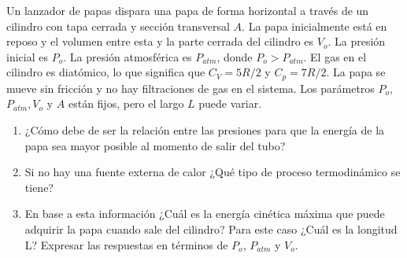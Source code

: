 \begin{mdframed}[style=warning]
	\begin{ejercicio}
		Un lanzador de papas dispara una papa de forma horizontal a través de un cilindro con tapa cerrada y sección transversal $A$. La papa inicialmente está en reposo y el volumen entre esta y la parte cerrada del cilindro es $V_o$. La presión inicial es $P_o$. La presión atmosférica es $P_{atm}$, donde $P_o > P_{atm}$. El gas en el cilindro es diatómico, lo que significa que $C_V = 5R/2$ y $C_p = 7R/2$. La papa se mueve sin fricción y no hay filtraciones de gas en el sistema. Los parámetros $P_o$, $P_{atm}, V_o$ y $A$ están fijos, pero el largo $L$ puede variar.
		\begin{enumerate}
			\item ¿Cómo debe de ser la relación entre las presiones para que la energía de la papa sea mayor posible al momento de salir del tubo?
			\item Si no hay una fuente externa de calor ¿Qué tipo de proceso termodinámico se tiene?
			\item En base a esta información ¿Cuál es la energía cinética máxima que puede adquirir la papa cuando sale del cilindro? Para este caso ¿Cuál es la longitud L? Expresar las respuestas en términos de $P_o$, $P_{atm}$ y $V_o$.
		\end{enumerate}
	\end{ejercicio}
\end{mdframed}




















